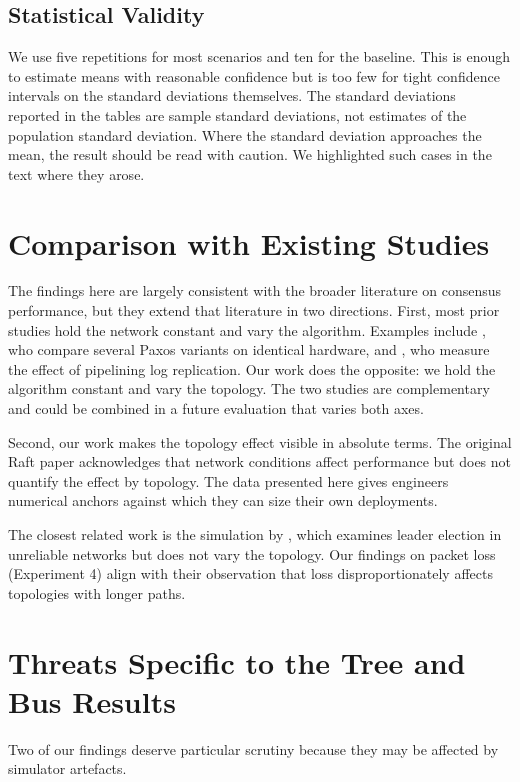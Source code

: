 \subsection{Statistical Validity}

We use five repetitions for most scenarios and ten for the baseline. This is enough to estimate means with reasonable confidence but is too few for tight confidence intervals on the standard deviations themselves. The standard deviations reported in the tables are sample standard deviations, not estimates of the population standard deviation. Where the standard deviation approaches the mean, the result should be read with caution. We highlighted such cases in the text where they arose.

\section{Comparison with Existing Studies}

The findings here are largely consistent with the broader literature on consensus performance, but they extend that literature in two directions. First, most prior studies hold the network constant and vary the algorithm. Examples include \citet{howard2020}, who compare several Paxos variants on identical hardware, and \citet{wang2017}, who measure the effect of pipelining log replication. Our work does the opposite: we hold the algorithm constant and vary the topology. The two studies are complementary and could be combined in a future evaluation that varies both axes.

Second, our work makes the topology effect visible in absolute terms. The original Raft paper acknowledges that network conditions affect performance but does not quantify the effect by topology. The data presented here gives engineers numerical anchors against which they can size their own deployments.

The closest related work is the simulation by \citet{larrea2018}, which examines leader election in unreliable networks but does not vary the topology. Our findings on packet loss (Experiment 4) align with their observation that loss disproportionately affects topologies with longer paths.

\section{Threats Specific to the Tree and Bus Results}

Two of our findings deserve particular scrutiny because they may be affected by simulator artefacts.

